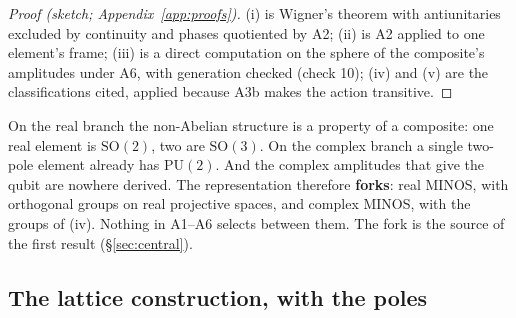 \documentclass[11pt,a4paper]{article}
\theoremstyle{plain}
\theoremstyle{definition}
\theoremstyle{remark}
\newcommand{\SO}{\mathrm{SO}}
\newcommand{\PU}{\mathrm{PU}}
\begin{document}
\begin{proof}[Proof (sketch; Appendix~\ref{app:proofs})]
(i) is Wigner's theorem \cite{wigner,bargmann} with antiunitaries excluded by continuity and phases quotiented by A2; (ii) is A2 applied to one element's frame; (iii) is a direct computation on the sphere of the composite's amplitudes under A6, with generation checked (check 10); (iv) and (v) are the classifications cited, applied because A3b makes the action transitive.
\end{proof}

On the real branch the non-Abelian structure is a property of a composite: one real element is $\SO(2)$, two are $\SO(3)$. On the complex branch a single two-pole element already has $\PU(2)$. And the complex amplitudes that give the qubit are nowhere derived. The representation therefore \textbf{forks}: real MINOS, with orthogonal groups on real projective spaces, and complex MINOS, with the groups of (iv). Nothing in A1--A6 selects between them. The fork is the source of the first result (\S\ref{sec:central}).

\subsection{The lattice construction, with the poles}\label{sec:construction}
\end{document}
